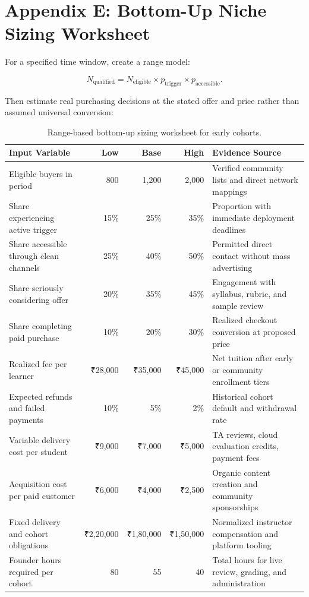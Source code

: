 \section*{Appendix E: Bottom-Up Niche Sizing Worksheet}

For a specified time window, create a range model:

\begin{equation}
N_{\text{qualified}} = N_{\text{eligible}} \times p_{\text{trigger}} \times p_{\text{accessible}}.
\end{equation}

Then estimate real purchasing decisions at the stated offer and price rather than assumed universal conversion:

\begin{table}[t]
\centering
\small
\begin{tabularx}{\textwidth}{l r r r X}
\toprule
\textbf{Input Variable} & \textbf{Low} & \textbf{Base} & \textbf{High} & \textbf{Evidence Source} \\
\midrule
Eligible buyers in period & 800 & 1,200 & 2,000 & Verified community lists and direct network mappings \\
Share experiencing active trigger & 15\% & 25\% & 35\% & Proportion with immediate deployment deadlines \\
Share accessible through clean channels & 25\% & 40\% & 50\% & Permitted direct contact without mass advertising \\
Share seriously considering offer & 20\% & 35\% & 45\% & Engagement with syllabus, rubric, and sample review \\
Share completing paid purchase & 10\% & 20\% & 30\% & Realized checkout conversion at proposed price \\
Realized fee per learner & ₹28,000 & ₹35,000 & ₹45,000 & Net tuition after early or community enrollment tiers \\
Expected refunds and failed payments & 10\% & 5\% & 2\% & Historical cohort default and withdrawal rate \\
Variable delivery cost per student & ₹9,000 & ₹7,000 & ₹5,000 & TA reviews, cloud evaluation credits, payment fees \\
Acquisition cost per paid customer & ₹6,000 & ₹4,000 & ₹2,500 & Organic content creation and community sponsorships \\
Fixed delivery and cohort obligations & ₹2,20,000 & ₹1,80,000 & ₹1,50,000 & Normalized instructor compensation and platform tooling \\
Founder hours required per cohort & 80 & 55 & 40 & Total hours for live review, grading, and administration \\
\bottomrule
\end{tabularx}
\caption{Range-based bottom-up sizing worksheet for early cohorts.}
\label{tab:ch7-sizing-worksheet}
\end{table}

